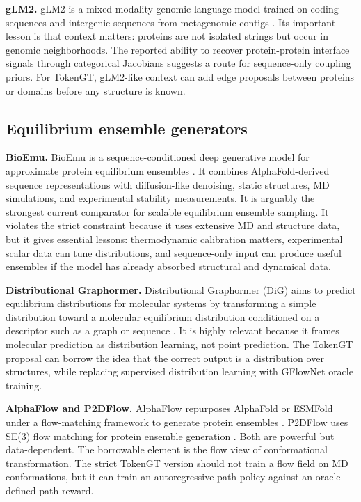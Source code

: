 \documentclass[11pt]{article}
\begin{document}
\textbf{gLM2.} gLM2 is a mixed-modality genomic language model trained on coding sequences and intergenic sequences from metagenomic contigs \cite{cornman2024omg}. Its important lesson is that context matters: proteins are not isolated strings but occur in genomic neighborhoods. The reported ability to recover protein-protein interface signals through categorical Jacobians suggests a route for sequence-only coupling priors. For TokenGT, gLM2-like context can add edge proposals between proteins or domains before any structure is known.

\subsection{Equilibrium ensemble generators}

\textbf{BioEmu.} BioEmu is a sequence-conditioned deep generative model for approximate protein equilibrium ensembles \cite{lewis2025bioemu}. It combines AlphaFold-derived sequence representations with diffusion-like denoising, static structures, MD simulations, and experimental stability measurements. It is arguably the strongest current comparator for scalable equilibrium ensemble sampling. It violates the strict constraint because it uses extensive MD and structure data, but it gives essential lessons: thermodynamic calibration matters, experimental scalar data can tune distributions, and sequence-only input can produce useful ensembles if the model has already absorbed structural and dynamical data.

\textbf{Distributional Graphormer.} Distributional Graphormer (DiG) aims to predict equilibrium distributions for molecular systems by transforming a simple distribution toward a molecular equilibrium distribution conditioned on a descriptor such as a graph or sequence \cite{zheng2024dig}. It is highly relevant because it frames molecular prediction as distribution learning, not point prediction. The TokenGT proposal can borrow the idea that the correct output is a distribution over structures, while replacing supervised distribution learning with GFlowNet oracle training.

\textbf{AlphaFlow and P2DFlow.} AlphaFlow repurposes AlphaFold or ESMFold under a flow-matching framework to generate protein ensembles \cite{jing2024alphaflow}. P2DFlow uses SE(3) flow matching for protein ensemble generation \cite{jin2025p2dflow}. Both are powerful but data-dependent. The borrowable element is the flow view of conformational transformation. The strict TokenGT version should not train a flow field on MD conformations, but it can train an autoregressive path policy against an oracle-defined path reward.
\end{document}
